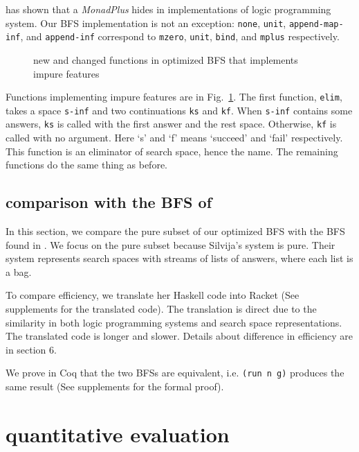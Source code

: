 \documentclass[format=acmlarge, review=true, authordraft=true]{acmart}
\begin{document}
\citet{kiselyov2005backtracking} has shown that a \emph{MonadPlus} hides in 
implementations of logic programming system. Our BFS implementation is not an 
exception: \texttt{none}, \texttt{unit}, \texttt{append-map-inf}, and 
\texttt{append-inf} correspond to \texttt{mzero}, \texttt{unit}, \texttt{bind}, 
and \texttt{mplus} respectively.

\begin{figure}
		
	\caption{new and changed functions in optimized BFS that implements impure 
		features}
	\label{BFS-opt-cont}
\end{figure}

Functions implementing impure features are in Fig.~\ref{BFS-opt-cont}. The 
first function, \texttt{elim}, takes a space \texttt{s-inf} and two 
continuations \texttt{ks} and \texttt{kf}. When \texttt{s-inf} contains some 
answers, \texttt{ks} is called with the first answer and the rest space. 
Otherwise, \texttt{kf} is called with no argument. Here `s' and `f' means 
`succeed' and `fail' respectively. This function is an eliminator of search 
space, hence the name. The remaining functions do the same thing as before.

\subsection{comparison with the BFS of \citet{seres1999algebra}}

In this section, we compare the pure subset of our optimized BFS with the BFS 
found in \citet{seres1999algebra}. We focus on the pure subset because 
Silvija's system is pure. Their system represents search spaces with streams of 
lists of answers, where each list is a bag.

To compare efficiency, we translate her Haskell code into Racket (See 
supplements for the translated code). The translation is direct 
due to the similarity in both logic programming systems and search space 
representations. The translated code is longer and slower. Details about 
difference in efficiency are in section 6.

We prove in Coq that the two BFSs are equivalent, i.e. \texttt{(run n g)} 
produces the same result (See supplements for the formal proof).

\section{quantitative evaluation}
\end{document}

